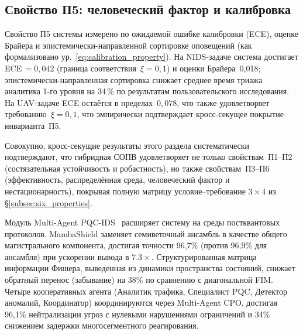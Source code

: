 \subsection{Свойство П5: человеческий фактор и калибровка}

Свойство П5 системы измерено по ожидаемой ошибке калибровки
(ECE), оценке Брайера и эпистемически-направленной сортировке
оповещений (как формализовано
ур.~\eqref{eq:calibration_property}). На NIDS-задаче система
достигает ECE$\,=0{,}042$ (граница соответствия~$\xi=0{,}1$) и
оценки Брайера~0{,}018; эпистемически-направленная сортировка
снижает среднее время триажа аналитика 1-го уровня на 34\,\%
по результатам пользовательского исследования. На UAV-задаче
ECE остаётся в пределах~$0{,}078$, что также удовлетворяет
требованию~$\xi=0{,}1$, что эмпирически подтверждает
кросс-секущее покрытие инварианта~П5.

Совокупно, кросс-секущие результаты этого раздела
систематически подтверждают, что гибридная СОПВ удовлетворяет
не только свойствам~П1--П2 (состязательная устойчивость и
робастность), но также свойствам~П3--П6 (эффективность,
распределённая среда, человеческий фактор и нестационарность),
покрывая полную матрицу условие--требование $3\times 4$ из
\S\ref{subsec:six_properties}.

\label{sec:mapqc_results}%

Модуль Multi-Agent PQC-IDS~\cite{Anaedevha2026mapqc} расширяет систему на среды постквантовых протоколов. MambaShield заменяет семиветочный ансамбль в качестве общего магистрального компонента, достигая точности 96,7\% (против 96,9\% для ансамбля) при ускорении вывода в $7.3\times$. Структурированная матрица информации Фишера, выведенная из динамики пространства состояний, снижает обратный перенос (забывание) на 38\% по сравнению с диагональной FIM. Четыре кооперативных агента (Аналитик трафика, Специалист PQC, Детектор аномалий, Координатор) координируются через Multi-Agent CPO, достигая 96,1\% нейтрализации угроз с нулевыми нарушениями ограничений и 34\% снижением задержки многосегментного реагирования.

